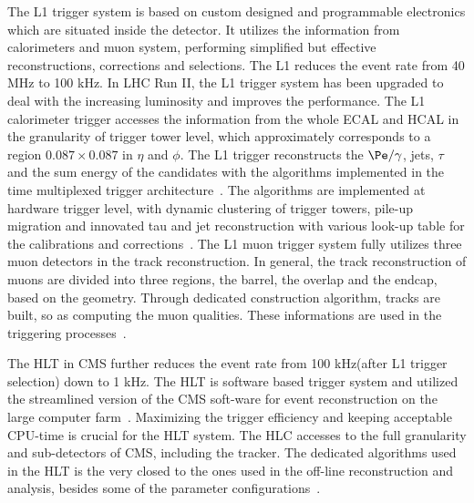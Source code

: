 The L1 trigger system is based on custom designed and programmable electronics which are situated inside the detector. It utilizes the information from calorimeters and muon system, performing simplified but effective reconstructions, corrections and selections. The L1 reduces the event rate from 40 MHz to 100 kHz. In LHC Run II, the L1 trigger system has been upgraded to deal with the increasing luminosity and improves the performance. The L1 calorimeter trigger accesses the information from the whole ECAL and HCAL in the granularity of trigger tower level, which approximately corresponds to a region $0.087\times0.087$ in $\eta$ and $\phi$. The L1 trigger reconstructs the $\Pe/\gamma$, jets, $\tau$ and the sum energy of the candidates with the algorithms implemented in the time multiplexed trigger architecture~\cite{TMT_trigger}. The algorithms are implemented at hardware trigger level, with dynamic clustering of trigger towers, pile-up migration and innovated tau and jet reconstruction with various look-up table for the calibrations and corrections~\cite{L1_Egamma}. The L1 muon trigger system fully utilizes three muon detectors in the track reconstruction. In general, the track reconstruction of muons are divided into three regions, the barrel, the overlap and the endcap, based on the geometry. Through dedicated construction algorithm, tracks are built, so as computing the muon qualities. These informations are used in the triggering processes~\cite{L1muontrigger}. 


The HLT in CMS further reduces the event rate from 100 kHz(after L1 trigger selection) down to 1 kHz. The HLT is software based trigger system and utilized the streamlined version of the CMS soft-ware for event reconstruction on the large computer farm~\cite{CMS_trigger_RUNII}. Maximizing the trigger efficiency and keeping acceptable CPU-time is crucial for the HLT system. The HLC accesses to the full granularity and sub-detectors of CMS, including the tracker. The dedicated algorithms used in the HLT is the very closed to the ones used in the off-line reconstruction and analysis, besides some of the parameter configurations~\cite{CMS_HLT_RunII}.             












